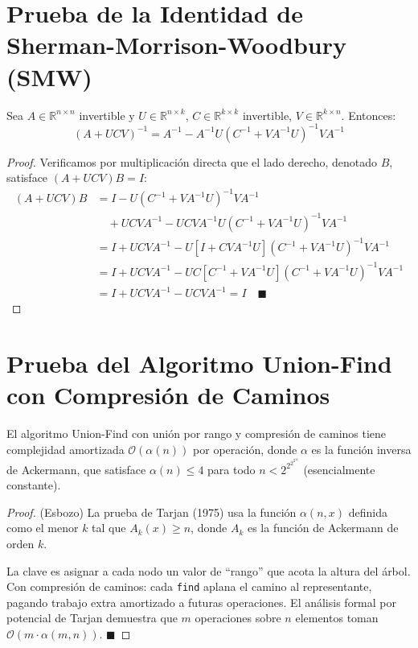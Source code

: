 \section{Prueba de la Identidad de Sherman-Morrison-Woodbury (SMW)}

\begin{theorem}
Sea $A \in \mathbb{R}^{n\times n}$ invertible y $U \in \mathbb{R}^{n\times k}$, $C \in \mathbb{R}^{k\times k}$ invertible,
$V \in \mathbb{R}^{k\times n}$. Entonces:
\begin{equation}
(A + UCV)^{-1} = A^{-1} - A^{-1}U(C^{-1} + VA^{-1}U)^{-1}VA^{-1}
\end{equation}
\end{theorem}

\begin{proof}
Verificamos por multiplicación directa que el lado derecho, denotado $B$, satisface $(A + UCV)B = I$:
\begin{align}
(A+UCV)B &= I - U(C^{-1} + VA^{-1}U)^{-1}VA^{-1} \\
&\quad + UCVA^{-1} - UCVA^{-1}U(C^{-1}+VA^{-1}U)^{-1}VA^{-1} \\
&= I + UCVA^{-1} - U\left[I + CVA^{-1}U\right](C^{-1}+VA^{-1}U)^{-1}VA^{-1} \\
&= I + UCVA^{-1} - UC\left[C^{-1} + VA^{-1}U\right](C^{-1}+VA^{-1}U)^{-1}VA^{-1} \\
&= I + UCVA^{-1} - UCVA^{-1} = I \quad \blacksquare
\end{align}
\end{proof}

\section{Prueba del Algoritmo Union-Find con Compresión de Caminos}

\begin{theorem}
El algoritmo Union-Find con unión por rango y compresión de caminos tiene complejidad
amortizada $\mathcal{O}(\alpha(n))$ por operación, donde $\alpha$ es la función inversa de Ackermann,
que satisface $\alpha(n) \le 4$ para todo $n < 2^{2^{2^{2^{16}}}}$ (esencialmente constante).
\end{theorem}

\begin{proof}(Esbozo)
La prueba de Tarjan (1975) usa la función $\alpha(n,x)$ definida como el menor $k$ tal que
$A_k(x) \ge n$, donde $A_k$ es la función de Ackermann de orden $k$.

La clave es asignar a cada nodo un valor de ``rango'' que acota la altura del árbol.
Con compresión de caminos: cada \texttt{find} aplana el camino al representante,
pagando trabajo extra amortizado a futuras operaciones. El análisis formal por potencial
de Tarjan demuestra que $m$ operaciones sobre $n$ elementos toman $\mathcal{O}(m \cdot \alpha(m,n))$. $\blacksquare$
\end{proof}
